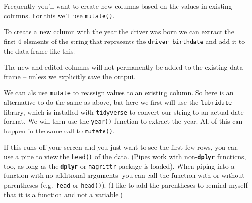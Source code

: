 \documentclass[]{book}
\newenvironment{Shaded}{\begin{snugshade}}{\end{snugshade}}
\newcommand{\DataTypeTok}[1]{\textcolor[rgb]{0.13,0.29,0.53}{#1}}
\newcommand{\DecValTok}[1]{\textcolor[rgb]{0.00,0.00,0.81}{#1}}
\newcommand{\KeywordTok}[1]{\textcolor[rgb]{0.13,0.29,0.53}{\textbf{#1}}}
\newcommand{\NormalTok}[1]{#1}
\newcommand{\OperatorTok}[1]{\textcolor[rgb]{0.81,0.36,0.00}{\textbf{#1}}}
\newcommand{\StringTok}[1]{\textcolor[rgb]{0.31,0.60,0.02}{#1}}
\begin{document}
Frequently you'll want to create new columns based on the values in existing columns. For this we'll use \texttt{mutate()}.

To create a new column with the year the driver was born we can extract the first 4 elements of the string that represents the \texttt{driver\_birthdate} and add it to the data frame like this:

\begin{Shaded}
\end{Shaded}

The new and edited columns will not permanently be added to the existing data frame -- unless we explicitly save the output.

We can als use \texttt{mutate} to reassign values to an existing column. So here is an alternative to do the same as above, but here we first will use the \texttt{lubridate} library, which is installed with \texttt{tidyverse} to convert our string to an actual date format. We will then use the \texttt{year()} function to extract the year. All of this can happen in the same call to \texttt{mutate()}.

\begin{Shaded}
\end{Shaded}

If this runs off your screen and you just want to see the first few rows, you
can use a pipe to view the \texttt{head()} of the data. (Pipes work with non-\textbf{\texttt{dplyr}}
functions, too, as long as the \textbf{\texttt{dplyr}} or \texttt{magrittr} package is loaded). When piping into a function with no additional arguments, you can call the
function with or without parentheses (e.g.~\texttt{head} or \texttt{head()}). (I like to add the parentheses to remind myself that it is a function and not a variable.)
\end{document}
